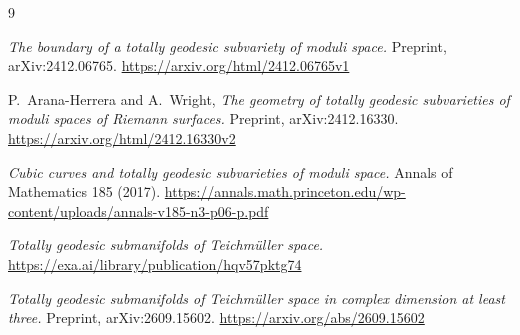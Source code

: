 \documentclass[11pt]{amsart}
\theoremstyle{definition}
\theoremstyle{remark}
\begin{document}
\begin{thebibliography}{9}

\emph{The boundary of a totally geodesic subvariety of moduli space.}
Preprint, arXiv:2412.06765.
\url{https://arxiv.org/html/2412.06765v1}

P.~Arana-Herrera and A.~Wright,
\emph{The geometry of totally geodesic subvarieties of moduli spaces of
Riemann surfaces.} Preprint, arXiv:2412.16330.
\url{https://arxiv.org/html/2412.16330v2}

\emph{Cubic curves and totally geodesic subvarieties of moduli space.}
Annals of Mathematics 185 (2017).
\url{https://annals.math.princeton.edu/wp-content/uploads/annals-v185-n3-p06-p.pdf}

\emph{Totally geodesic submanifolds of Teichm\"uller space.}
\url{https://exa.ai/library/publication/hqv57pktg74}

\emph{Totally geodesic submanifolds of Teichm\"uller space in complex
dimension at least three.} Preprint, arXiv:2609.15602.
\url{https://arxiv.org/abs/2609.15602}

\end{thebibliography}
\end{document}
